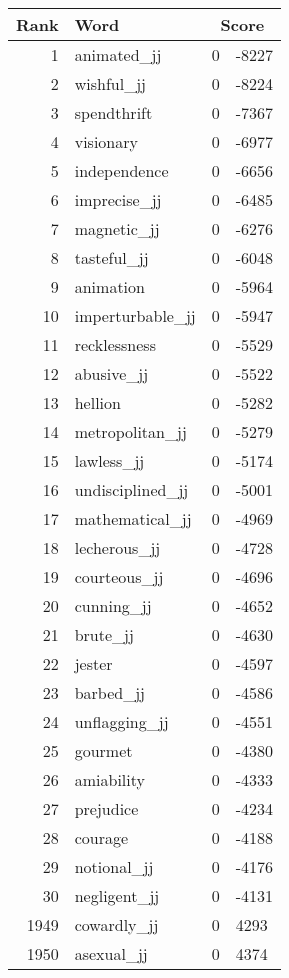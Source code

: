 \begin{longtable}[!htbp]{| rlr@{.}l |}
    \hline
    \textbf{Rank} & \textbf{Word} & \multicolumn{2}{c|}{\textbf{Score}} \\
    \hline
    \endhead
    1 & animated\_jj & 0 & -8227 \\
    2 & wishful\_jj & 0 & -8224 \\
    3 & spendthrift & 0 & -7367 \\
    4 & visionary & 0 & -6977 \\
    5 & independence & 0 & -6656 \\
    6 & imprecise\_jj & 0 & -6485 \\
    7 & magnetic\_jj & 0 & -6276 \\
    8 & tasteful\_jj & 0 & -6048 \\
    9 & animation & 0 & -5964 \\
    10 & imperturbable\_jj & 0 & -5947 \\
    11 & recklessness & 0 & -5529 \\
    12 & abusive\_jj & 0 & -5522 \\
    13 & hellion & 0 & -5282 \\
    14 & metropolitan\_jj & 0 & -5279 \\
    15 & lawless\_jj & 0 & -5174 \\
    16 & undisciplined\_jj & 0 & -5001 \\
    17 & mathematical\_jj & 0 & -4969 \\
    18 & lecherous\_jj & 0 & -4728 \\
    19 & courteous\_jj & 0 & -4696 \\
    20 & cunning\_jj & 0 & -4652 \\
    21 & brute\_jj & 0 & -4630 \\
    22 & jester & 0 & -4597 \\
    23 & barbed\_jj & 0 & -4586 \\
    24 & unflagging\_jj & 0 & -4551 \\
    25 & gourmet & 0 & -4380 \\
    26 & amiability & 0 & -4333 \\
    27 & prejudice & 0 & -4234 \\
    28 & courage & 0 & -4188 \\
    29 & notional\_jj & 0 & -4176 \\
    30 & negligent\_jj & 0 & -4131 \\
    1949 & cowardly\_jj & 0 & 4293 \\
    1950 & asexual\_jj & 0 & 4374 \\

\end{longtable}
